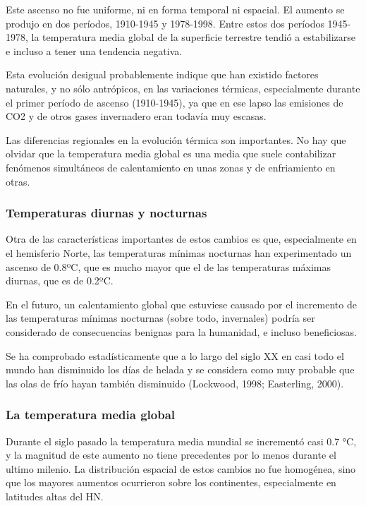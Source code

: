 \documentclass[
  a4paper,12pt]{extarticle}
\begin{document}
Este ascenso no fue uniforme, ni en forma temporal ni espacial. El
aumento se produjo en dos períodos, 1910-1945 y 1978-1998. Entre estos
dos períodos 1945-1978, la temperatura media global de la superficie
terrestre tendió a estabilizarse e incluso a tener una tendencia
negativa.

Esta evolución desigual probablemente indique que han existido factores
naturales, y no sólo antrópicos, en las variaciones térmicas,
especialmente durante el primer período de ascenso (1910-1945), ya que
en ese lapso las emisiones de CO2 y de otros gases invernadero eran
todavía muy escasas.

Las diferencias regionales en la evolución térmica son importantes. No
hay que olvidar que la temperatura media global es una media que suele
contabilizar fenómenos simultáneos de calentamiento en unas zonas y de
enfriamiento en otras.

\hypertarget{temperaturas-diurnas-y-nocturnas}{%
\subsubsection{Temperaturas diurnas y
nocturnas}\label{temperaturas-diurnas-y-nocturnas}}

Otra de las características importantes de estos cambios es que,
especialmente en el hemisferio Norte, las temperaturas mínimas nocturnas
han experimentado un ascenso de 0.8ºC, que es mucho mayor que el de las
temperaturas máximas diurnas, que es de 0.2ºC.

En el futuro, un calentamiento global que estuviese causado por el
incremento de las temperaturas mínimas nocturnas (sobre todo,
invernales) podría ser considerado de consecuencias benignas para la
humanidad, e incluso beneficiosas.

Se ha comprobado estadísticamente que a lo largo del siglo XX en casi
todo el mundo han disminuido los días de helada y se considera como muy
probable que las olas de frío hayan también disminuido (Lockwood, 1998;
Easterling, 2000).

\hypertarget{la-temperatura-media-global}{%
\subsubsection{La temperatura media
global}\label{la-temperatura-media-global}}

Durante el siglo pasado la temperatura media mundial se incrementó casi
0.7 °C, y la magnitud de este aumento no tiene precedentes por lo menos
durante el ultimo milenio. La distribución espacial de estos cambios no
fue homogénea, sino que los mayores aumentos ocurrieron sobre los
continentes, especialmente en latitudes altas del HN.
\end{document}
